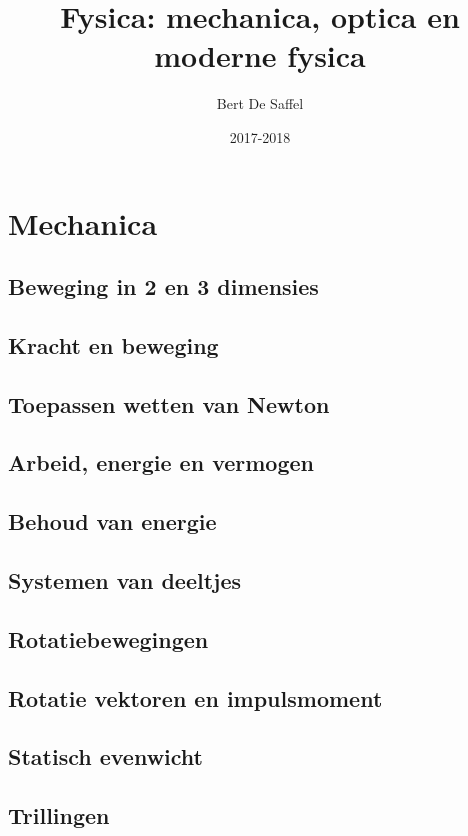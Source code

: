 \documentclass[12pt]{report}
\title{Fysica: mechanica, optica en moderne fysica}
\author{Bert De Saffel}
\date{2017-2018}
\begin{document}
\maketitle
\tableofcontents

\part{Mechanica}
\chapter{Beweging in 2 en 3 dimensies}

\chapter{Kracht en beweging}

\chapter{Toepassen wetten van Newton}

\chapter{Arbeid, energie en vermogen}

\chapter{Behoud van energie}

\chapter{Systemen van deeltjes}

\chapter{Rotatiebewegingen}

\chapter{Rotatie vektoren en impulsmoment}

\chapter{Statisch evenwicht}

\chapter{Trillingen}
\end{document}
